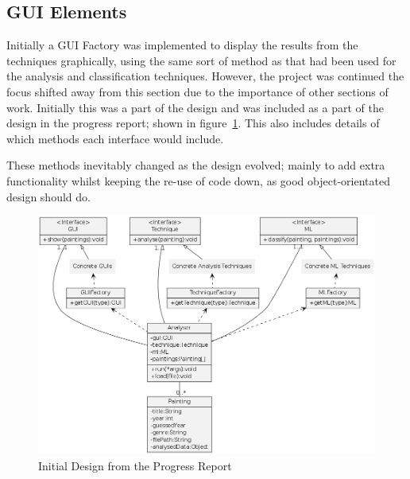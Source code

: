 \subsection{GUI Elements}

Initially a GUI Factory was implemented to display the results from the techniques graphically, 
using the same sort of method as that had been used for the analysis and classification 
techniques. However, the project was continued the focus shifted away from this section due to
the importance of other sections of work. Initially this was a part of the design and was included 
as a part of the design in the progress report; shown in figure~\ref{fig:prog-design}. This also 
includes details of which methods each interface would include.

These methods inevitably changed as the design evolved; mainly to add extra functionality whilst
keeping the re-use of code down, as good object-orientated design should do.

\begin{figure}[h]
\includegraphics[width=\textwidth]{../ProgressReport/img/design.png}
\caption{Initial Design from the Progress Report}\label{fig:prog-design}
\end{figure}
